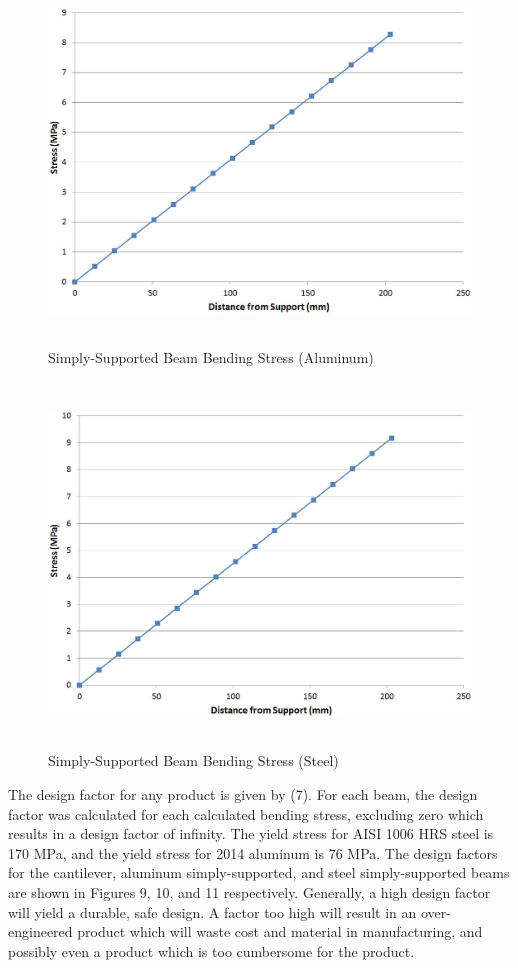 \documentclass[12pt]{article}
\begin{document}
\begin{figure}[h!]  
  \centering
    \includegraphics[width=\linewidth, height=3.8in]{simp_support_a_stress_vs_distance.JPG}
    \caption{Simply-Supported Beam Bending Stress (Aluminum)} 
\end{figure}

\bigskip

\begin{figure}[h!]  
  \centering
    \includegraphics[width=\linewidth, height=3.8in]{simp_support_s_stress_vs_distance.JPG}
    \caption{Simply-Supported Beam Bending Stress (Steel)} 
\end{figure}


\newpage

The design factor for any product is given by (7). For each beam, the design factor was calculated for each calculated bending stress, excluding zero which results in a design factor of infinity. The yield stress for AISI 1006 HRS steel is 170 MPa, and the yield stress for 2014 aluminum is 76 MPa. The design factors for the cantilever, aluminum simply-supported, and steel simply-supported beams are shown in Figures 9, 10, and 11 respectively. Generally, a high design factor will yield a durable, safe design. A factor too high will result in an over-engineered product which will waste cost and material in manufacturing, and possibly even a product which is too cumbersome for the product.
\bigskip
\end{document}
